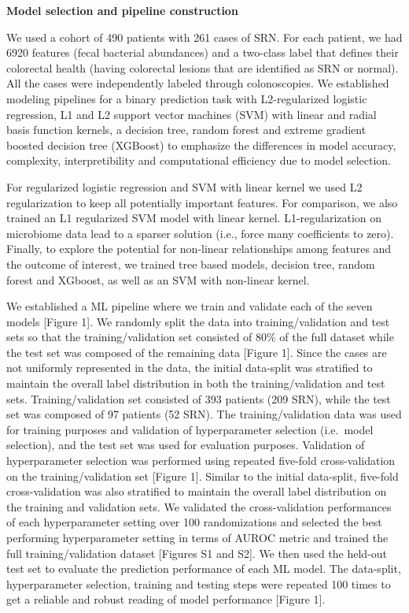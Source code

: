 \documentclass[11pt,]{article}
\begin{document}
\textbf{Model selection and pipeline construction}

We used a cohort of 490 patients with 261 cases of SRN. For each
patient, we had 6920 features (fecal bacterial abundances) and a
two-class label that defines their colorectal health (having colorectal
lesions that are identified as SRN or normal). All the cases were
independently labeled through colonoscopies. We established modeling
pipelines for a binary prediction task with L2-regularized logistic
regression, L1 and L2 support vector machines (SVM) with linear and
radial basis function kernels, a decision tree, random forest and
extreme gradient boosted decision tree (XGBoost) to emphasize the
differences in model accuracy, complexity, interpretibility and
computational efficiency due to model selection.

For regularized logistic regression and SVM with linear kernel we used
L2 regularization to keep all potentially important features. For
comparison, we also trained an L1 regularized SVM model with linear
kernel. L1-regularization on microbiome data lead to a sparser solution
(i.e., force many coefficients to zero). Finally, to explore the
potential for non-linear relationships among features and the outcome of
interest, we trained tree based models, decision tree, random forest and
XGboost, as well as an SVM with non-linear kernel.

We established a ML pipeline where we train and validate each of the
seven models {[}Figure 1{]}. We randomly split the data into
training/validation and test sets so that the training/validation set
consisted of 80\% of the full dataset while the test set was composed of
the remaining data {[}Figure 1{]}. Since the cases are not uniformly
represented in the data, the initial data-split was stratified to
maintain the overall label distribution in both the training/validation
and test sets. Training/validation set consisted of 393 patients (209
SRN), while the test set was composed of 97 patients (52 SRN). The
training/validation data was used for training purposes and validation
of hyperparameter selection (i.e.~model selection), and the test set was
used for evaluation purposes. Validation of hyperparameter selection was
performed using repeated five-fold cross-validation on the
training/validation set {[}Figure 1{]}. Similar to the initial
data-split, five-fold cross-validation was also stratified to maintain
the overall label distribution on the training and validation sets. We
validated the cross-validation performances of each hyperparameter
setting over 100 randomizations and selected the best performing
hyperparameter setting in terms of AUROC metric and trained the full
training/validation dataset {[}Figures S1 and S2{]}. We then used the
held-out test set to evaluate the prediction performance of each ML
model. The data-split, hyperparameter selection, training and testing
steps were repeated 100 times to get a reliable and robust reading of
model performance {[}Figure 1{]}.
\end{document}
